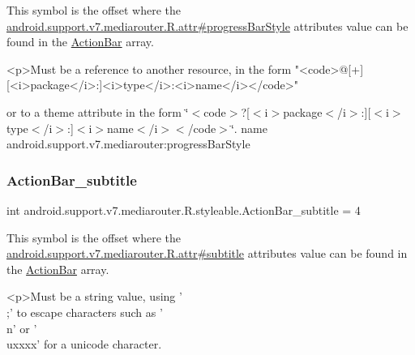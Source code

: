 This symbol is the offset where the \hyperlink{classandroid_1_1support_1_1v7_1_1mediarouter_1_1R_1_1attr_a906d7d46aeb18deb13d9cc9c44a9246a}{android.\+support.\+v7.\+mediarouter.\+R.\+attr\#progress\+Bar\+Style} attribute\textquotesingle{}s value can be found in the \hyperlink{classandroid_1_1support_1_1v7_1_1mediarouter_1_1R_1_1styleable_adc4d3c0d096085367f12d025007aa53f}{Action\+Bar} array.

\begin{DoxyVerb}      <p>Must be a reference to another resource, in the form "<code>@[+][<i>package</i>:]<i>type</i>:<i>name</i></code>"
\end{DoxyVerb}
 or to a theme attribute in the form \char`\"{}$<$code$>$?\mbox{[}$<$i$>$package$<$/i$>$\+:\mbox{]}\mbox{[}$<$i$>$type$<$/i$>$\+:\mbox{]}$<$i$>$name$<$/i$>$$<$/code$>$\char`\"{}.  name android.\+support.\+v7.\+mediarouter\+:progress\+Bar\+Style \mbox{\label{classandroid_1_1support_1_1v7_1_1mediarouter_1_1R_1_1styleable_a867c4a1f26c8644959ad41993d80d123}} 
\subsubsection{\texorpdfstring{Action\+Bar\+\_\+subtitle}{ActionBar\_subtitle}}
{\footnotesize\ttfamily int android.\+support.\+v7.\+mediarouter.\+R.\+styleable.\+Action\+Bar\+\_\+subtitle = 4\hspace{0.3cm}{\ttfamily [static]}}

This symbol is the offset where the \hyperlink{classandroid_1_1support_1_1v7_1_1mediarouter_1_1R_1_1attr_a66bf2c904966e1bb3cca8099c7dc3882}{android.\+support.\+v7.\+mediarouter.\+R.\+attr\#subtitle} attribute\textquotesingle{}s value can be found in the \hyperlink{classandroid_1_1support_1_1v7_1_1mediarouter_1_1R_1_1styleable_adc4d3c0d096085367f12d025007aa53f}{Action\+Bar} array.

\begin{DoxyVerb}      <p>Must be a string value, using '\\;' to escape characters such as '\\n' or '\\uxxxx' for a unicode character.
\end{DoxyVerb}
 

